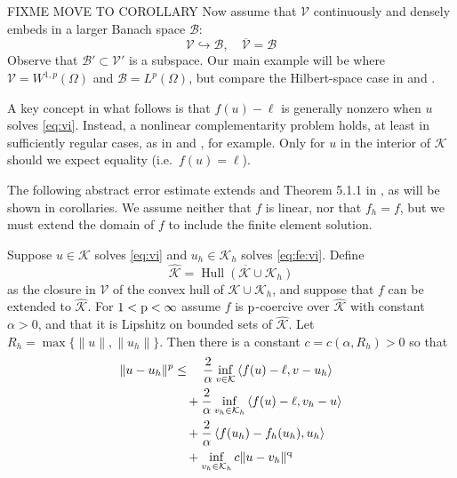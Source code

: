 \documentclass[hidelinks,onefignum,onetabnum,final]{siamart220329}  %
\newcommand{\cB}{\mathcal{B}}
\newcommand{\cK}{\mathcal{K}}
\newcommand{\cV}{\mathcal{V}}
\newcommand{\hcK}{\widehat{\cK}}
\newcommand{\pp}{{\text{\textnormal{p}}}}
\newcommand{\qq}{{\text{\textnormal{q}}}}
\newcommand{\ip}[2]{\left<#1,#2\right>}
\DeclareMathOperator*{\Hull}{Hull}
\begin{document}
FIXME MOVE TO COROLLARY Now assume that $\cV$ continuously and densely embeds in a larger Banach space $\cB$:
\begin{equation}
\cV \hookrightarrow \cB, \quad \overline{\cV} = \cB
\end{equation}
Observe that $\cB' \subset \cV'$ is a subspace.  Our main example will be where $\cV=W^{1,p}(\Omega)$ and $\cB=L^p(\Omega)$, but compare the Hilbert-space case in \cite{Falk1974} and \cite[section 5.1]{Ciarlet2002}.

A key concept in what follows is that $f(u)-\ell$ is generally nonzero when $u$ solves \eqref{eq:vi}.  Instead, a nonlinear complementarity problem holds, at least in sufficiently regular cases, as in \cite[Exercise 5.1.1]{Ciarlet2002}  and \cite[section 7]{BuelerFarrell2024}, for example.  Only for $u$ in the interior of $\cK$ should we expect equality (i.e.~$f(u)=\ell$).

The following abstract error estimate extends \cite{Falk1974} and Theorem 5.1.1 in \cite{Ciarlet2002}, as will be shown in corollaries.  We assume neither that $f$ is linear, nor that $f_h=f$, but we must extend the domain of $f$ to include the finite element solution.

\begin{theorem} \label{thm:abstractestimate}  Suppose $u\in\cK$ solves \eqref{eq:vi} and $u_h\in\cK_h$ solves \eqref{eq:fe:vi}.  Define
\begin{equation}
\hcK = \overline{\Hull{(\cK \cup \cK_h)}}  \label{eq:convexhull}
\end{equation}
as the closure in $\cV$ of the convex hull of $\cK \cup \cK_h$, and suppose that $f$ can be extended to $\hcK$.  For $1<\pp<\infty$ assume $f$ is $\pp$-coercive over $\hcK$ with constant $\alpha>0$, and that it is Lipshitz on bounded sets of $\hcK$.  Let $R_h=\max\{\|u\|,\|u_h\|\}$.  Then there is a constant $c=c(\alpha,R_h)>0$ so that
\begin{align}
\|u-u_h\|^p &\le \quad \frac{2}{\alpha} \inf_{v\in\cK} \ip{f(u)-\ell}{v-u_h} \label{eq:abstractestimate} \\
   &\quad + \frac{2}{\alpha} \inf_{v_h\in\cK_h} \ip{f(u)-\ell}{v_h-u} \notag \\
   &\quad + \frac{2}{\alpha} \ip{f(u_h)-f_h(u_h)}{u_h} \notag \\
   &\quad + \inf_{v_h\in\cK_h} c \|u - v_h\|^\qq \notag
\end{align}
\end{theorem}
\end{document}
